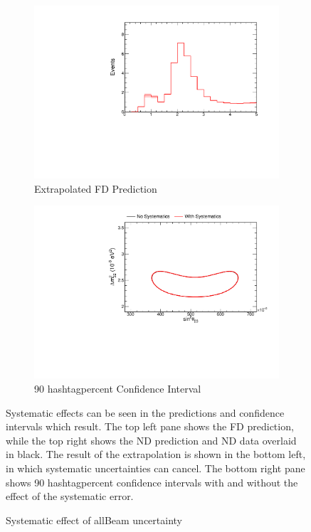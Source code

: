 \begin{figure}
\begin{center}
\begin{subfigure}[c]{0.49\textwidth}
\includegraphics[width=\textwidth]{figures/systs/prediction/fd_extrap_prediction_allBeam.pdf}
\caption*{Extrapolated FD Prediction}
\end{subfigure}
\begin{subfigure}[c]{0.49\textwidth}
\includegraphics[width=\textwidth]{figures/systs/prediction/fd_extrap_contour_allBeam.pdf}
\caption*{90 hashtagpercent Confidence Interval}
\end{subfigure}
\end{center}
\caption{Systematic effect of allBeam uncertainty}{
Systematic effects can be seen in the predictions and confidence intervals
which result.
The top left pane shows the FD prediction, while the top right shows the
ND prediction and ND data overlaid in black.
The result of the extrapolation is shown in the bottom left, in which
systematic uncertainties can cancel.
The bottom right pane shows 90 hashtagpercent confidence intervals with and without
the effect of the systematic error.}
\label{syst_fig_allBeam}

\end{figure}



